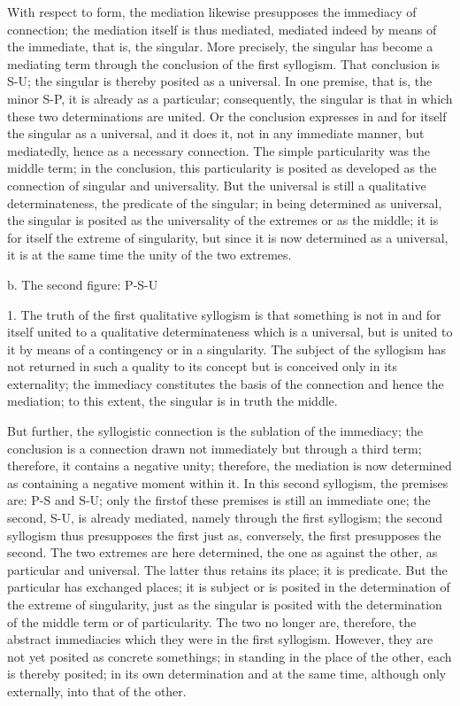 With respect to form, the mediation likewise
presupposes the immediacy of connection;
the mediation itself is thus mediated,
mediated indeed by means of the immediate,
that is, the singular.
More precisely, the singular has become a mediating term
through the conclusion of the first syllogism.
That conclusion is S-U;
the singular is thereby posited as a universal.
In one premise, that is, the minor S-P,
it is already as a particular;
consequently, the singular is that
in which these two determinations are united.
Or the conclusion expresses in and for itself
the singular as a universal,
and it does it, not in any immediate manner, but mediatedly,
hence as a necessary connection.
The simple particularity was the middle term;
in the conclusion, this particularity is posited
as developed as the connection of singular and universality.
But the universal is still a qualitative determinateness,
the predicate of the singular;
in being determined as universal,
the singular is posited as the universality of the extremes
or as the middle;
it is for itself the extreme of singularity,
but since it is now determined as a universal,
it is at the same time the unity of the two extremes.

b. The second figure: P-S-U

1. The truth of the first qualitative syllogism is
that something is not in and for itself united
to a qualitative determinateness which is a universal,
but is united to it by means of a contingency
or in a singularity.
The subject of the syllogism has not returned
in such a quality to its concept
but is conceived only in its externality;
the immediacy constitutes the basis of
the connection and hence the mediation;
to this extent, the singular is in truth the middle.

But further, the syllogistic connection is
the sublation of the immediacy;
the conclusion is a connection drawn not immediately
but through a third term;
therefore, it contains a negative unity;
therefore, the mediation is now determined
as containing a negative moment within it.
In this second syllogism, the premises are: P-S and S-U;
only the firstof these premises is still an immediate one;
the second, S-U, is already mediated,
namely through the first syllogism;
the second syllogism thus presupposes the first just as, conversely,
the first presupposes the second.
The two extremes are here determined,
the one as against the other, as particular and universal.
The latter thus retains its place; it is predicate.
But the particular has exchanged places;
it is subject or is posited in the
determination of the extreme of singularity,
just as the singular is posited with
the determination of the middle term or of particularity.
The two no longer are, therefore, the abstract immediacies
which they were in the first syllogism.
However, they are not yet posited as concrete somethings;
in standing in the place of the other, each is thereby posited;
in its own determination and at the same time,
although only externally, into that of the other.

